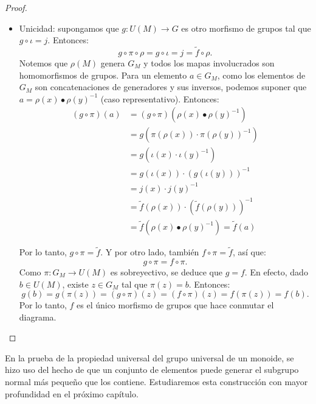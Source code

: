 \begin{proof}
\begin{itemize}
		\item Unicidad: supongamos que \( g : U(M) \to G \) es otro morfismo de grupos tal que \( g \circ \iota = j \). Entonces:
		\[
		g \circ \pi \circ \rho = g \circ \iota = j = \tilde{f} \circ \rho.
		\]
		Notemos que \( \rho(M) \) genera \( G_M \) y todos los mapas involucrados son homomorfismos de grupos. Para un elemento \( a \in G_M \), como los elementos de \( G_M \) son concatenaciones de generadores y sus inversos, podemos suponer que \( a = \rho(x)\bullet\rho(y)^{-1} \) (caso representativo). Entonces:		
		\begin{align*}
			(g\circ\pi)(a) 
			&= (g\circ\pi)(\rho(x)\bullet\rho(y)^{-1}) \\
			&= g\left(\pi(\rho(x)) \cdot \pi(\rho(y))^{-1}\right) \\
			&= g\left(\iota(x) \cdot \iota(y)^{-1}\right) \\
			&= g(\iota(x)) \cdot \left(g(\iota(y))\right)^{-1} \\
			&= j(x) \cdot j(y)^{-1} \\
			&= \tilde{f}(\rho(x)) \cdot \left(\tilde{f}(\rho(y))\right)^{-1} \\
			&= \tilde{f}(\rho(x)\bullet\rho(y)^{-1}) = \tilde{f}(a)
		\end{align*}
		
		Por lo tanto, \( g \circ \pi = \tilde{f} \).  Y por otro lado, también \( f \circ \pi = \tilde{f} \), así que:
		\[
		g \circ \pi = f \circ \pi.
		\]
		Como \( \pi : G_M \to U(M) \) es sobreyectivo, se deduce que \( g = f \). En efecto, dado \( b \in U(M) \), existe \( z \in G_M \) tal que \( \pi(z) = b \). Entonces:
		\[
		g(b) = g(\pi(z)) = (g \circ \pi)(z) = (f \circ \pi)(z) = f(\pi(z)) = f(b).
		\]
		Por lo tanto, \( f \) es el único morfismo de grupos que hace conmutar el diagrama.
	\end{itemize}
\end{proof}

 En la prueba de la propiedad universal del grupo universal de un monoide, se hizo uso del hecho de que un conjunto de elementos puede generar el subgrupo normal más pequeño que los contiene. Estudiaremos esta construcción con mayor profundidad en el próximo capítulo.


\begin{corolario}
\end{corolario}


